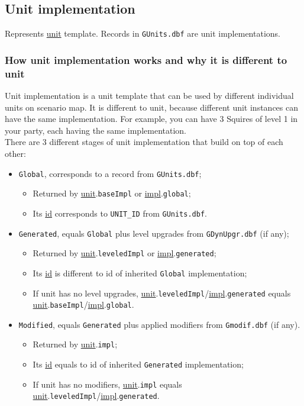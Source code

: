 \subsection{Unit implementation}
\label{UnitImpl}
Represents \hyperref[Unit]{unit} template. Records in \texttt{GUnits.dbf} are unit implementations.
\subsubsection{How unit implementation works and why it is different to unit}
Unit implementation is a unit template that can be used by different individual units on scenario map. It is different to unit, because different unit instances can have the same implementation. For example, you can have 3 Squires of level 1 in your party, each having the same implementation.\\
There are 3 different stages of unit implementation that build on top of each other:
\begin{itemize}
\item \texttt{Global}, corresponds to a record from \texttt{GUnits.dbf};
\begin{itemize}
\item Returned by \hyperref[Unit]{unit}.\texttt{baseImpl} or \hyperref[UnitImpl]{impl}.\texttt{global};
\item Its \hyperref[Id]{id} corresponds to \texttt{UNIT\_ID} from \texttt{GUnits.dbf}.
\end{itemize}
\item \texttt{Generated}, equals \texttt{Global} plus level upgrades from \texttt{GDynUpgr.dbf} (if any);
\begin{itemize}
\item Returned by \hyperref[Unit]{unit}.\texttt{leveledImpl} or \hyperref[UnitImpl]{impl}.\texttt{generated};
\item Its \hyperref[Id]{id} is different to id of inherited \texttt{Global} implementation;
\item If unit has no level upgrades, \hyperref[Unit]{unit}.\texttt{leveledImpl}/\hyperref[UnitImpl]{impl}.\texttt{generated} equals \hyperref[Unit]{unit}.\texttt{baseImpl}/\hyperref[UnitImpl]{impl}.\texttt{global}.
\end{itemize}
\item \texttt{Modified}, equals \texttt{Generated} plus applied modifiers from \texttt{Gmodif.dbf} (if any).
\begin{itemize}
\item Returned by \hyperref[Unit]{unit}.\texttt{impl};
\item Its \hyperref[Id]{id} equals to id of inherited \texttt{Generated} implementation;
\item If unit has no modifiers, \hyperref[Unit]{unit}.\texttt{impl} equals \hyperref[Unit]{unit}.\texttt{leveledImpl}/\hyperref[UnitImpl]{impl}.\texttt{generated}.
\end{itemize}
\end{itemize}
